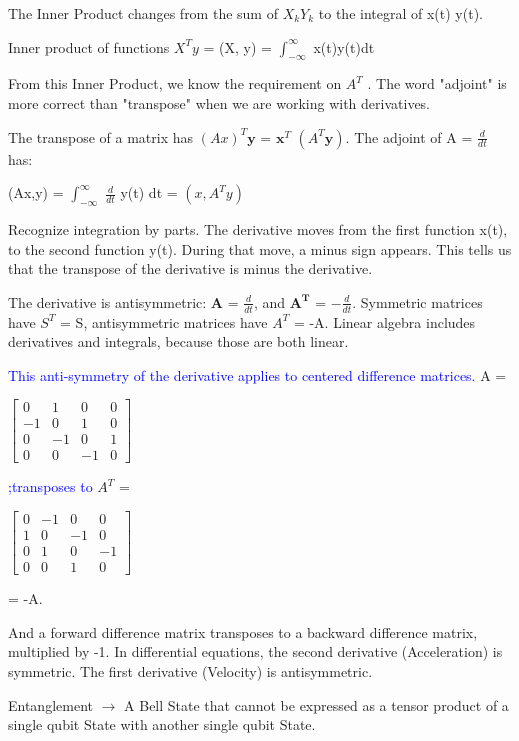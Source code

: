 \documentclass[a4paper, 10pt, onepage]{elegantbook}
\begin{document}
{The Inner Product changes from the sum of $X_k Y_k$ to the integral of x(t) y(t). 

Inner product of functions $X^{T}y$ = (X, y) = $\int_{- \infty}^\infty$ x(t)y(t)dt  

From this Inner Product, we know the requirement on $A^T$ . The word "adjoint" is more
correct than "transpose" when we are working with derivatives.  

The transpose of a matrix has $(Ax)^{T} \mathbf y$ = $\mathbf{x}^T$ $(A^T \mathbf y)$. The adjoint of A = 
$\frac{d}{dt}$ has:

(Ax,y) = $\int_{- \infty}^\infty$ $\frac{d}{dt}$ y(t) dt = $(x, A^{T}y)$

Recognize integration by parts. The derivative moves from the first
function x(t), to the second function y(t). During that move, a minus sign appears.
This tells us that the transpose of the derivative is minus the derivative.

The derivative is antisymmetric: $\mathbf{A}$ = $\frac{d}{dt}$, and $\mathbf{A^T}$ = ${- \frac{d}{dt}}$. Symmetric 
matrices have $S^T$ = S, antisymmetric matrices have $A^T$ = -A. Linear algebra includes derivatives and integrals, 
because those are both linear.  

\textcolor{blue}{This anti-symmetry of the derivative applies to centered difference matrices.} A =  

$
\begin{bmatrix}
0 & 1 & 0 & 0 \\
-1 & 0 & 1 & 0 \\
0 & -1 & 0 & 1 \\
0 & 0 & -1 & 0
\end{bmatrix}
$
\noindent

\textcolor{blue}{;transposes to} $A^T$ =  

$
\begin{bmatrix}
0 & -1 & 0 & 0 \\
1 & 0 & -1 & 0 \\
0 & 1 & 0 & -1 \\
0 & 0 & 1 & 0
\end{bmatrix}
$

= -A.  

And a forward difference matrix transposes to a backward difference matrix, multiplied
by -1. In differential equations, the second derivative (Acceleration) is symmetric. The
first derivative (Velocity) is antisymmetric.  

 
Entanglement $\longrightarrow$ A Bell State that cannot be expressed as a tensor product of a 
single qubit State with another single qubit State. 
 
}
\end{document}

